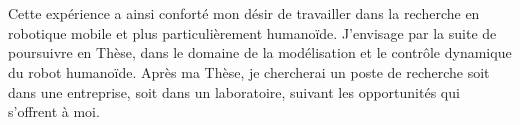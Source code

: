 \documentclass{report}
\begin{document}
\section*{} %


Cette expérience a ainsi conforté mon désir de travailler dans la recherche en robotique mobile et plus particulièrement humanoïde. J'envisage par la suite de poursuivre en Thèse, dans le domaine de la modélisation et le contrôle dynamique du robot humanoïde. Après ma Thèse, je chercherai un poste de recherche soit dans une entreprise, soit dans un laboratoire, suivant les opportunités qui s'offrent à moi.




\appendix




\clearpage
{}

\end{document}
